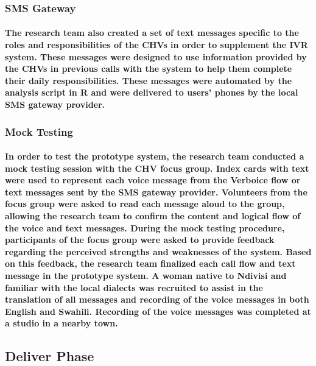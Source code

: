 \subsubsection{SMS Gateway}
\paragraph{The research team also created a set of text messages specific to the roles and responsibilities of the CHVs in order to supplement the IVR system. These messages were designed to use information provided by the CHVs in previous calls with the system to help them complete their daily responsibilities. These messages were automated by the analysis script in R and were delivered to users' phones by the local SMS gateway provider. }

\subsubsection{Mock Testing}
\paragraph{In order to test the prototype system, the research team conducted a mock testing session with the CHV focus group. Index cards with text were used to represent each voice message from the Verboice flow or text messages sent by the SMS gateway provider. Volunteers from the focus group were asked to read each message aloud to the group, allowing the research team to confirm the content and logical flow of the voice and text messages. During the mock testing procedure, participants of the focus group were asked to provide feedback regarding the perceived strengths and weaknesses of the system. Based on this feedback, the research team finalized each call flow and text message in the prototype system. A woman native to Ndivisi and familiar with the local dialects was recruited to assist in the translation of all messages and recording of the voice messages in both English and Swahili. Recording of the voice messages was completed at a studio in a nearby town.}

\subsection{Deliver Phase}
